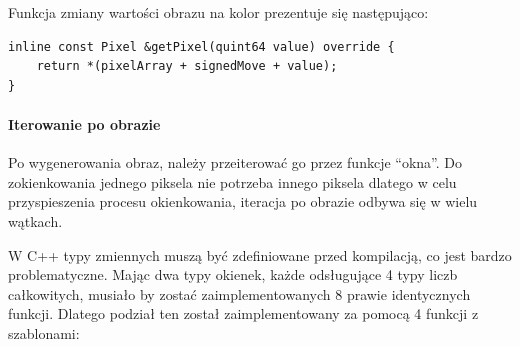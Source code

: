 \par
Funkcja zmiany wartości obrazu na kolor prezentuje się następująco:
\begin{lstlisting}
inline const Pixel &getPixel(quint64 value) override {
    return *(pixelArray + signedMove + value);
}
\end{lstlisting}

\paragraph{Iterowanie po obrazie}
\par
Po wygenerowania obraz, należy przeiterować go przez funkcje \enquote{okna}.
Do zokienkowania jednego piksela nie potrzeba innego piksela dlatego w celu przyspieszenia procesu okienkowania, iteracja po obrazie odbywa się w wielu wątkach.
\par
W C++ typy zmiennych muszą być zdefiniowane przed kompilacją, co jest bardzo problematyczne.
Mając dwa typy okienek, każde odsługujące 4 typy liczb całkowitych, musiało by zostać zaimplementowanych 8 prawie identycznych funkcji.
Dlatego podział ten został zaimplementowany za pomocą 4 funkcji z szablonami:
